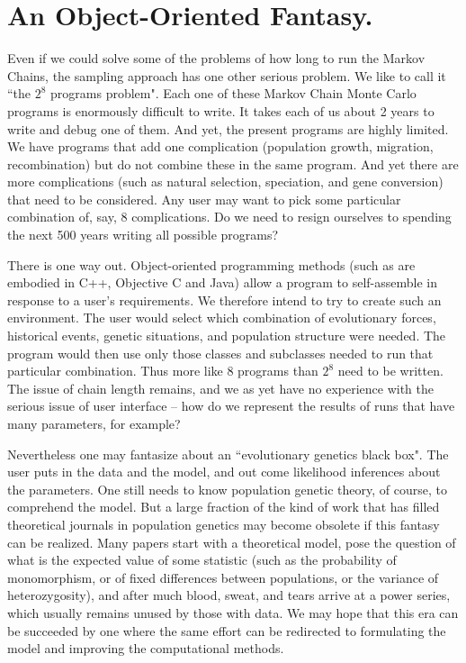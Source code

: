 \section{An Object-Oriented Fantasy.}

Even if we could solve some of the problems of how long to run the Markov
Chains, the sampling approach has one other serious problem.  We like to
call it ``the $2^8$ programs problem".  Each one of these Markov Chain Monte
Carlo programs is enormously difficult to write.  It takes each of us about
2 years to write and debug one of them.  And yet, the present programs are
highly limited.  We have programs that add one complication (population
growth, migration, recombination) but do not combine these in the same
program.  And yet there are more complications (such as natural selection,
speciation, and gene conversion) that need to be considered.  Any user may
want to pick some particular combination of, say, 8 complications.  Do we
need to resign ourselves to spending the next 500 years writing all possible
programs?  

There is one way out.  Object-oriented programming methods (such as are
embodied in C++, Objective C and Java) allow a program to self-assemble in
response to a user's requirements.  We therefore intend to try to create
such an environment.  The user would select which combination of evolutionary
forces, historical events, genetic situations, and population structure
were needed.  The program would then use only those classes and subclasses
needed to run that particular combination.  Thus more like 8 programs than
$2^8$ need to be written.  The issue of chain length remains, and we as
yet have no experience with the serious issue of user interface -- how do we
represent the results of runs that have many parameters, for example?

Nevertheless one may fantasize about an ``evolutionary genetics black box".
The user puts in the data and the model, and out come likelihood inferences
about the parameters.  One still needs to know population genetic theory,
of course, to comprehend the model.  But a large fraction of the kind of
work that has filled theoretical journals in population genetics may become
obsolete if this fantasy can be realized.  Many papers start with a theoretical
model, pose the question of what is the expected value of some statistic
(such as the probability of monomorphism, or of fixed differences between
populations,
or the variance of heterozygosity), and after much blood, sweat, and tears
arrive at a power series, which usually remains unused by those with data.
We may hope that this era can be succeeded by one where the same effort can be
redirected to formulating the model and improving the computational methods.

